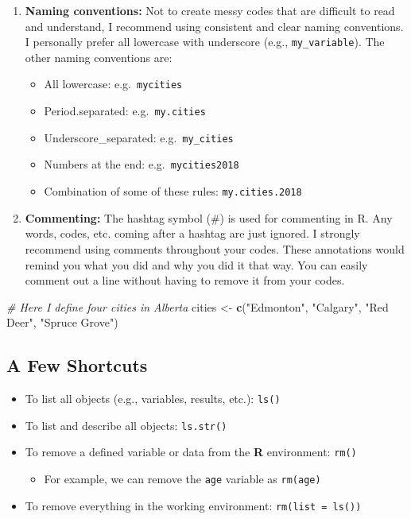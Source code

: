 \documentclass[]{book}
\newenvironment{Shaded}{\begin{snugshade}}{\end{snugshade}}
\newcommand{\CommentTok}[1]{\textcolor[rgb]{0.56,0.35,0.01}{\textit{#1}}}
\newcommand{\KeywordTok}[1]{\textcolor[rgb]{0.13,0.29,0.53}{\textbf{#1}}}
\newcommand{\NormalTok}[1]{#1}
\newcommand{\StringTok}[1]{\textcolor[rgb]{0.31,0.60,0.02}{#1}}
\providecommand{\tightlist}{%
  \setlength{\itemsep}{0pt}\setlength{\parskip}{0pt}}
\begin{document}
\begin{enumerate}
\def\labelenumi{\arabic{enumi}.}
\setcounter{enumi}{2}
\item
  \textbf{Naming conventions:} Not to create messy codes that are difficult to read and understand, I recommend using consistent and clear naming conventions. I personally prefer all lowercase with underscore (e.g., \texttt{my\_variable}). The other naming conventions are:

  \begin{itemize}
  \tightlist
  \item
    All lowercase: e.g.~\texttt{mycities}
  \item
    Period.separated: e.g.~\texttt{my.cities}
  \item
    Underscore\_separated: e.g.~\texttt{my\_cities}
  \item
    Numbers at the end: e.g.~\texttt{mycities2018}
  \item
    Combination of some of these rules: \texttt{my.cities.2018}
  \end{itemize}
\item
  \textbf{Commenting:} The hashtag symbol (\#) is used for commenting in R. Any words, codes, etc. coming after a hashtag are just ignored. I strongly recommend using comments throughout your codes. These annotations would remind you what you did and why you did it that way. You can easily comment out a line without having to remove it from your codes.
\end{enumerate}

\begin{Shaded}
\begin{Highlighting}[]
\CommentTok{# Here I define four cities in Alberta}
\NormalTok{cities <-}\StringTok{ }\KeywordTok{c}\NormalTok{(}\StringTok{"Edmonton"}\NormalTok{, }\StringTok{"Calgary"}\NormalTok{, }\StringTok{"Red Deer"}\NormalTok{, }\StringTok{"Spruce Grove"}\NormalTok{)}
\end{Highlighting}
\end{Shaded}

\hypertarget{a-few-shortcuts}{%
\subsection{A Few Shortcuts}\label{a-few-shortcuts}}

\begin{itemize}
\item
  To list all objects (e.g., variables, results, etc.): \texttt{ls()}
\item
  To list and describe all objects: \texttt{ls.str()}
\item
  To remove a defined variable or data from the \textbf{R} environment: \texttt{rm()}

  \begin{itemize}
  \tightlist
  \item
    For example, we can remove the \texttt{age} variable as \texttt{rm(age)}
  \end{itemize}
\item
  To remove everything in the working environment: \texttt{rm(list\ =\ ls())}
\end{itemize}
\end{document}
